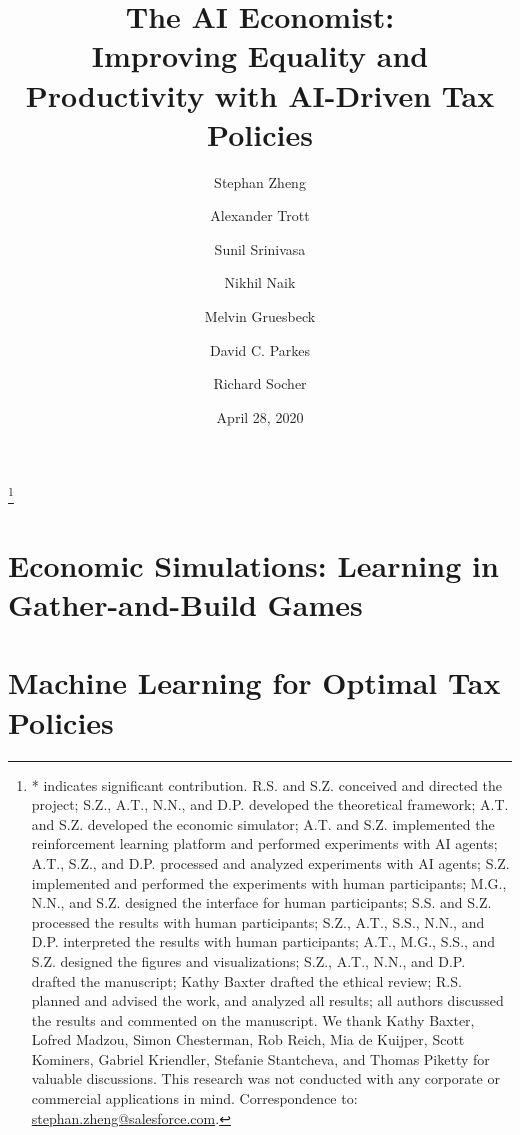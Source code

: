 \documentclass{article}
\title{
The AI Economist: \\
Improving Equality and Productivity with AI-Driven Tax Policies}
\author[*,1]{Stephan Zheng}
\author[*,1]{Alexander Trott}
\author[1]{Sunil Srinivasa}
\author[1]{Nikhil Naik}
\author[1]{Melvin Gruesbeck}
\author[1,2]{David C. Parkes}
\author[1]{Richard Socher}
\affil[1]{Salesforce Research}
\affil[2]{Harvard University}
\date{April 28, 2020}
\begin{document}
\maketitle
{\let\thefootnote\relax\footnote{
* indicates significant contribution.
R.S. and S.Z. conceived and directed the project;
S.Z., A.T., N.N., and D.P. developed the theoretical framework;
A.T. and S.Z. developed the economic simulator;
A.T. and S.Z. implemented the reinforcement learning platform and performed experiments with AI agents;
A.T., S.Z., and D.P. processed and analyzed experiments with AI agents;
S.Z. implemented and performed the experiments with human participants;
M.G., N.N., and S.Z. designed the interface for human participants;
S.S. and S.Z. processed the results with human participants;
S.Z., A.T., S.S., N.N., and D.P. interpreted the results with human participants;
A.T., M.G., S.S., and S.Z. designed the figures and visualizations;
S.Z., A.T., N.N., and D.P. drafted the manuscript;
Kathy Baxter drafted the ethical review;
R.S. planned and advised the work, and analyzed all results;
all authors discussed the results and commented on the manuscript.
We thank Kathy Baxter,
Lofred Madzou, Simon Chesterman, Rob Reich, Mia de Kuijper, Scott Kominers, Gabriel Kriendler, Stefanie Stantcheva, and Thomas Piketty for valuable discussions.
This research was not conducted with any corporate or commercial applications in mind.
Correspondence to:
\url{stephan.zheng@salesforce.com}.
}}
\vspace{-.66in}













\section{Economic Simulations: Learning in Gather-and-Build Games}
\label{sec:econsim}






\section{Machine Learning for Optimal Tax Policies}
\label{sec:opttax}


\end{document}

